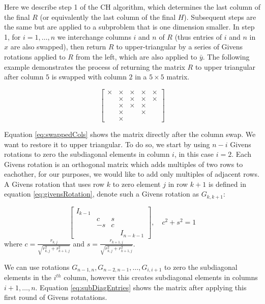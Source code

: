 \documentclass[12pt,Bold,letterpaper]{mcgilletdclass}
\begin{document}
Here we describe  step 1 of the CH algorithm, which determines the last column of the final $R$ 
(or equivalently the last column of the final $H$).
Subsequent steps are the same but are applied to a subproblem that is one dimension smaller. 
In step 1, for $i = 1,\dots,n$ we interchange
columns $i$ and $n$ of  $R$ (thus entries of $i$ and $n$ in $x$ are also swapped), then return $R$ to upper-triangular
by a series of Givens rotations applied to $R$ from the left, which  are also applied to $\bar{y}$. The following example demonstrates the process of returning the matrix $R$ to upper triangular after column $5$ is swapped with column $2$ in a $5 \times 5$ matrix.

\begin{equation} \label{eq:swappedCols}
\begin{bmatrix}
\times & \times & \times & \times & \times\\ 
  & \times & \times & \times & \times\\ 
  & \times & \times & \times &  \\ 
  & \times &  &  \times &  \\ 
  & \times &  &    & 
\end{bmatrix}
\end{equation}

Equation \ref{eq:swappedCols} shows the matrix directly after the column swap. We want to restore it to upper triangular. To do so, we start by using $n-i$ Givens rotations to zero the subdiagonal elements in column $i$, in this case $i = 2$. Each Givens rotation is an orthogonal matrix which adds multiples of two rows to eachother, for our purposes, we would like to add only multiples of adjacent rows. A Givens rotation that uses row $k$ to zero element $j$ in row $k+1$ is defined in equation \eqref{eq:givensRotation}, denote such a Givens rotation as $G_{k,k+1}$:

\begin{equation} \label{eq:givensRotation}
\begin{bmatrix}
I_{k-1} &  &  & \\ 
 & c & s & \\ 
 & -s & c & \\ 
 &  &  & I_{n-k-1}
\end{bmatrix} ,\quad c^2+s^2=1
\end{equation}
where $c=\frac{r_{k,j}}{\sqrt{r_{k,j}^2+r_{k+1,j}^2}}$ and $s=\frac{r_{k+1,j}}{\sqrt{r_{k,j}^2+r_{k+1,j}^2}}.$

We can use rotations $G_{n-1,n}, G_{n-2,n-1}, \dots, G_{i,i+1}$ to zero the subdiagonal elements in the $i^{th}$ column, however this creates subdiagonal elements in columns $i+1, \dots, n$. Equation \eqref{eq:subDiagEntries} shows the matrix after applying this first round of Givens rotatations.
\end{document}
